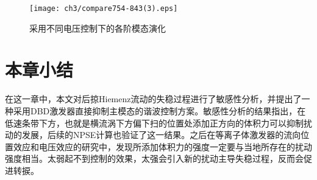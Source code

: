 \begin{figure}
  \centering
  \texttt{[image: ch3/compare754-843(3).eps]}\\
  \caption{采用不同电压控制下的各阶模态演化}\label{f:voltage}
\end{figure}

\section{本章小结}
在这一章中，本文对后掠Hiemenz流动的失稳过程进行了敏感性分析，并提出了一种采用DBD激发器直接抑制主模态的谐波控制方案。敏感性分析的结果指出，在低速条带下方，也就是横流涡下方偏下扫的位置处添加正方向的体积力可以抑制扰动的发展，后续的NPSE计算也验证了这一结果。之后在等离子体激发器的流向位置效应和电压效应的研究中，发现所添加体积力的强度一定要与当地所存在的扰动强度相当。太弱起不到控制的效果，太强会引入新的扰动主导失稳过程，反而会促进转捩。
